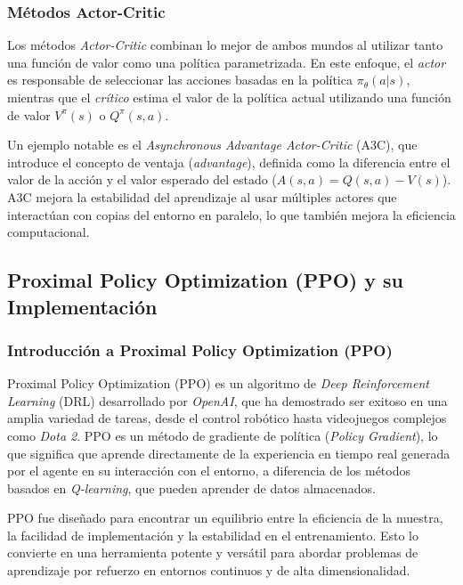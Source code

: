\documentclass[a4paper,12pt, twoside]{report}
\begin{document}
\subsubsection{Métodos Actor-Critic}

Los métodos \textit{Actor-Critic} combinan lo mejor de ambos mundos al utilizar tanto una 
función de valor como una política parametrizada. En este enfoque, el \textit{actor} es 
responsable de seleccionar las acciones basadas en la política \(\pi_{\theta}(a|s)\), mientras 
que el \textit{crítico} estima el valor de la política actual utilizando una función de valor 
\(V^{\pi}(s)\) o \(Q^{\pi}(s, a)\).

Un ejemplo notable es el \textit{Asynchronous Advantage Actor-Critic} (A3C), que introduce 
el concepto de ventaja (\textit{advantage}), definida como la diferencia entre el valor de 
la acción y el valor esperado del estado (\(A(s, a) = Q(s, a) - V(s)\)). A3C mejora la 
estabilidad del aprendizaje al usar múltiples actores que interactúan con copias del entorno 
en paralelo, lo que también mejora la eficiencia computacional.

\subsection{Proximal Policy Optimization (PPO) y su Implementación}

\subsubsection{Introducción a Proximal Policy Optimization (PPO)}

Proximal Policy Optimization (PPO) es un algoritmo de \textit{Deep Reinforcement Learning} 
(DRL) desarrollado por \textit{OpenAI}, que ha demostrado ser exitoso en una amplia variedad 
de tareas, desde el control robótico hasta videojuegos complejos como \textit{Dota 2}. 
PPO es un método de gradiente de política (\textit{Policy Gradient}), lo que significa 
que aprende directamente de la experiencia en tiempo real generada por el agente en su 
interacción con el entorno, a diferencia de los métodos basados en \textit{Q-learning}, 
que pueden aprender de datos almacenados.

PPO fue diseñado para encontrar un equilibrio entre la eficiencia de la muestra, la facilidad 
de implementación y la estabilidad en el entrenamiento. Esto lo convierte en una herramienta 
potente y versátil para abordar problemas de aprendizaje por refuerzo en entornos continuos y 
de alta dimensionalidad.
\end{document}
